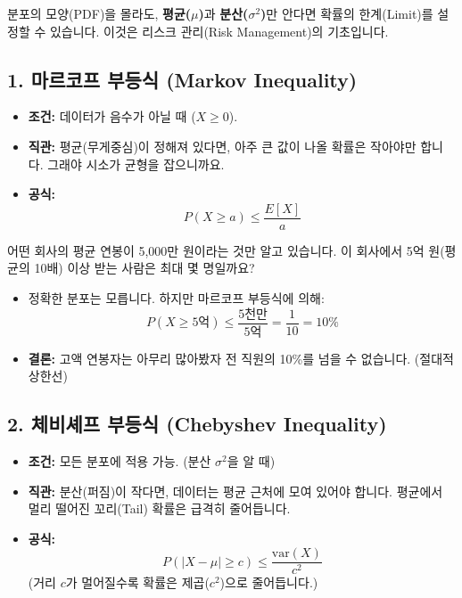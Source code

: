 \documentclass[11pt,a4paper]{book}
\theoremstyle{definition}
\begin{document}
분포의 모양(PDF)을 몰라도, \textbf{평균($\mu$)}과 \textbf{분산($\sigma^2$)}만 안다면 확률의 한계(Limit)를 설정할 수 있습니다. 이것은 리스크 관리(Risk Management)의 기초입니다.

\subsection{1. 마르코프 부등식 (Markov Inequality)}
\begin{conceptbox}[title={평균의 시소 원리}]
\begin{itemize}
    \item \textbf{조건:} 데이터가 음수가 아닐 때 ($X \ge 0$).
    \item \textbf{직관:} 평균(무게중심)이 정해져 있다면, 아주 큰 값이 나올 확률은 작아야만 합니다. 그래야 시소가 균형을 잡으니까요.
    \item \textbf{공식:}
    \[ P(X \ge a) \le \frac{E[X]}{a} \]
\end{itemize}
\end{conceptbox}

\begin{examplebox}[title={연봉 분포 미스터리}]
어떤 회사의 평균 연봉이 5,000만 원이라는 것만 알고 있습니다. 이 회사에서 5억 원(평균의 10배) 이상 받는 사람은 최대 몇 명일까요?
\begin{itemize}
    \item 정확한 분포는 모릅니다. 하지만 마르코프 부등식에 의해:
    \[ P(X \ge \text{5억}) \le \frac{\text{5천만}}{\text{5억}} = \frac{1}{10} = 10\% \]
    \item \textbf{결론:} 고액 연봉자는 아무리 많아봤자 전 직원의 10\%를 넘을 수 없습니다. (절대적 상한선)
\end{itemize}
\end{examplebox}

\subsection{2. 체비셰프 부등식 (Chebyshev Inequality)}
\begin{conceptbox}[title={분산이 알려주는 거리의 제약}]
\begin{itemize}
    \item \textbf{조건:} 모든 분포에 적용 가능. (분산 $\sigma^2$을 알 때)
    \item \textbf{직관:} 분산(퍼짐)이 작다면, 데이터는 평균 근처에 모여 있어야 합니다. 평균에서 멀리 떨어진 꼬리(Tail) 확률은 급격히 줄어듭니다.
    \item \textbf{공식:}
    \[ P(|X - \mu| \ge c) \le \frac{\text{var}(X)}{c^2} \]
    (거리 $c$가 멀어질수록 확률은 제곱($c^2$)으로 줄어듭니다.)
\end{itemize}
\end{conceptbox}
\end{document}

